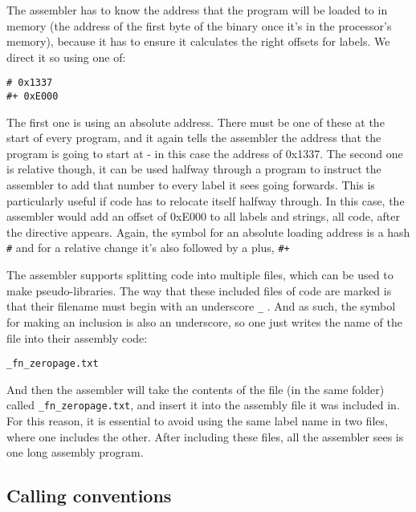 \documentclass[12pt,a4paper]{report}
\begin{document}
The assembler has to know the address that the program will be loaded to in memory (the address of the first byte of the binary once it's in the processor's memory), because it has to ensure it calculates the right offsets for labels. We direct it so using one of:
\begin{verbatim}
# 0x1337
#+ 0xE000
\end{verbatim}
The first one is using an absolute address. There must be one of these at the start of every program, and it again tells the assembler the address that the program is going to start at - in this case the address of 0x1337. The second one is relative though, it can be used halfway through a program to instruct the assembler to add that number to every label it sees going forwards. This is particularly useful if code has to relocate itself halfway through. In this case, the assembler would add an offset of 0xE000 to all labels and strings, all code, after the directive appears. Again, the symbol for an absolute loading address is a hash \texttt{\#} and for a relative change it's also followed by a plus, \texttt{\#+}

The assembler supports splitting code into multiple files, which can be used to make pseudo-libraries. The way that these included files of code are marked is that their filename must begin with an underscore \texttt{\_} . And as such, the symbol for making an inclusion is also an underscore, so one just writes the name of the file into their assembly code:
\begin{verbatim}
_fn_zeropage.txt
\end{verbatim}
And then the assembler will take the contents of the file (in the same folder) called \texttt{\_fn\_zeropage.txt}, and insert it into the assembly file it was included in. For this reason, it is essential to avoid using the same label name in two files, where one includes the other. After including these files, all the assembler sees is one long assembly program.


\subsection*{Calling conventions}
\end{document}
